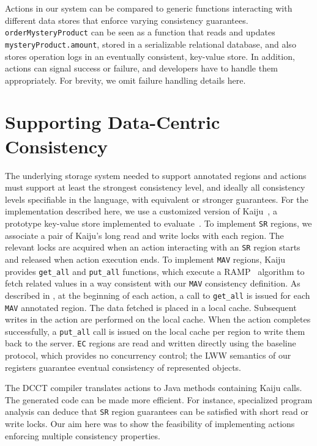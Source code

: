 \documentclass[numbers]{sigplanconf}
\begin{document}
Actions in our system can be compared to generic functions interacting
with different data stores that enforce varying consistency guarantees.
\texttt{orderMysteryProduct} can be seen as a function that
reads and updates \texttt{mysteryProduct.amount}, stored in a
serializable relational database, and also stores operation logs in an eventually consistent,
key-value store. In addition, actions can signal success
or failure, and developers have to handle them appropriately. For brevity, we
omit failure handling details here.

\section{Supporting Data-Centric Consistency}
\label{sec:underlyingsys}
The underlying storage system needed to support annotated regions and actions must
support at least the strongest consistency level, and ideally all consistency
levels specifiable in the language, with equivalent or stronger
guarantees. For the implementation described here, we use a customized
version of Kaiju~\cite{kaiju}, a prototype key-value store implemented to
evaluate~\cite{bailis2014scalable}. To implement \texttt{SR} regions, we
associate a pair of Kaiju's long read and write locks with each region. 
The relevant locks are acquired when an action interacting with an \texttt{SR}
region starts and released when action execution ends. 
To implement \texttt{MAV} regions, Kaiju provides
\texttt{get\_all} and \texttt{put\_all} functions, which execute a
RAMP~\cite{bailis2014scalable} algorithm
to fetch related values in a way consistent with our \texttt{MAV} consistency
definition. As described in \cite{bailis2014scalable}, at the beginning of
each action, a call to
\texttt{get\_all} is issued for each \texttt{MAV} annotated region.
The data fetched
is placed in a local cache. Subsequent writes in the action are performed on
the local cache. When the action completes successfully, a %
\texttt{put\_all} call is issued on the local cache per region to write them back to the server. 
%
\texttt{EC} regions are read and written directly using the baseline protocol, 
which provides no concurrency control; the LWW semantics of our registers guarantee
eventual consistency of represented objects. 

The DCCT compiler translates actions to Java methods containing Kaiju calls.
The generated code can be made more efficient. For instance, specialized 
program analysis can deduce that  \texttt{SR}  region guarantees can be satisfied 
with short read or write locks. Our aim here
was to show the feasibility of implementing actions enforcing multiple
consistency properties.
\end{document}
